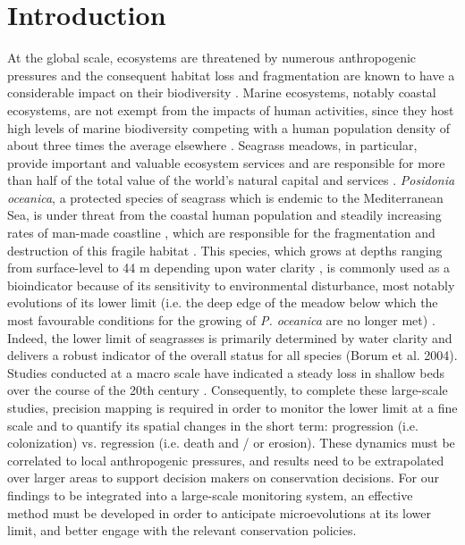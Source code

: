 \section{Introduction}\label{chapitre3_1}
At the global scale, ecosystems are threatened by numerous anthropogenic pressures \citep{hoekstra_confronting_2004, halpern_global_2008} and the consequent habitat loss and fragmentation are known to have a considerable impact on their biodiversity \citep{brooks_habitat_2002, haddad_habitat_2015}. Marine ecosystems, notably coastal ecosystems, are not exempt from the impacts of human activities, since they host high levels of marine biodiversity \citep{halpern_global_2008} competing with a human population density of about three times the average elsewhere \citep{small_global_2003}. Seagrass meadows, in particular, provide important and valuable ecosystem services and are responsible for more than half of the total value of the world’s natural capital and services \citep{costanza_value_1997, millenium_ecosystem_assessment_ecosystem_2005, ipbes_global_2019}. \textit{Posidonia oceanica}, a protected species of seagrass which is endemic to the Mediterranean Sea, is under threat from the coastal human population and steadily increasing rates of man-made coastline \citep{holon_impact_2015, holon_predictive_2018}, which are responsible for the fragmentation and destruction of this fragile habitat  \citep{montefalcone_human_2010, holon_impact_2015}. This species, which grows at depths ranging from surface-level to 44 m depending upon water clarity \citep{boudouresque_regression_2009}, is commonly used as a bioindicator because of its sensitivity to environmental disturbance, most notably evolutions of its lower limit (i.e. the deep edge of the meadow below which the most favourable conditions for the growing of \textit{P. oceanica} are no longer met) \citep{boudouresque_regression_2009, ruiz_mediterranean_2009}. Indeed, the lower limit of seagrasses is primarily determined by water clarity and delivers a robust indicator of the overall status for all species (Borum et al. 2004). Studies conducted at a macro scale have indicated a steady loss in shallow beds over the course of the 20th century \citep{marba_mediterranean_2014, holon_impact_2015}. Consequently, to complete these large-scale studies, precision mapping is required in order to monitor the lower limit at a fine scale and to quantify its spatial changes in the short term: progression (i.e. colonization) vs. regression (i.e. death and / or erosion). These dynamics must be correlated to local anthropogenic pressures, and results need to be extrapolated over larger areas to support decision makers on conservation decisions. For our findings to be integrated into a large-scale monitoring system, an effective method must be developed in order to anticipate microevolutions at its lower limit, and better engage with the relevant conservation policies.

